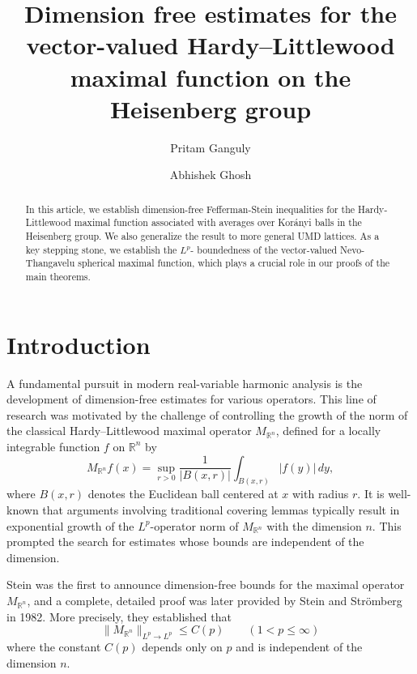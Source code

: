 \documentclass[11pt]{amsart}
\title[Dimension free bounds]{Dimension free estimates for the vector-valued Hardy--Littlewood maximal function on the Heisenberg group}
\author[Ganguly]{Pritam Ganguly}
\author[Ghosh]{Abhishek Ghosh}
\theoremstyle{definition}
\numberwithin{equation}{section}
\begin{document}
		


\begin{abstract}
In this article, we establish dimension-free Fefferman-Stein inequalities for the Hardy-Littlewood maximal function associated with averages over Kor\'anyi balls in the Heisenberg group. We also generalize the result to more general UMD lattices.  As a key stepping stone, we establish the $L^p$- boundedness of the vector-valued Nevo-Thangavelu spherical maximal function, which plays a crucial role in our proofs of the main theorems.
\end{abstract}
	
\maketitle	



\section{Introduction}
A fundamental pursuit in modern real-variable harmonic analysis is the development of dimension-free estimates for various operators. This line of research was motivated by the challenge of controlling the growth of the norm of the classical Hardy--Littlewood maximal operator $M_{\mathbb{R}^n}$, defined for a locally integrable function $f$ on $\mathbb{R}^n $ by  
\[
M_{\mathbb{R}^n}f(x) = \sup_{r > 0} \frac{1}{|B(x, r)|} \int_{B(x, r)} |f(y)| \, dy,
\]  
where $B(x, r)$ denotes the Euclidean ball centered at $ x $ with radius $r $. It is well-known that arguments involving traditional covering lemmas typically result in exponential growth of the $L^p$-operator norm of $M_{\mathbb{R}^n} $ with the dimension $n$.  This prompted the search for estimates whose bounds are independent of the dimension.  

Stein \cite{SteinSph} was the first to announce dimension-free bounds for the maximal operator $M_{\mathbb{R}^n}$, and a complete, detailed proof was later provided by Stein and Str\"omberg \cite{SS} in 1982. More precisely, they established that $$ \|M_{\mathbb{R}^n}\|_{L^p \to L^p} \leq C (p)\quad\quad (1<p\leq \infty) $$ where the constant $C (p)$ depends only on $ p $ and is independent of the dimension $ n $. 
\end{document}
